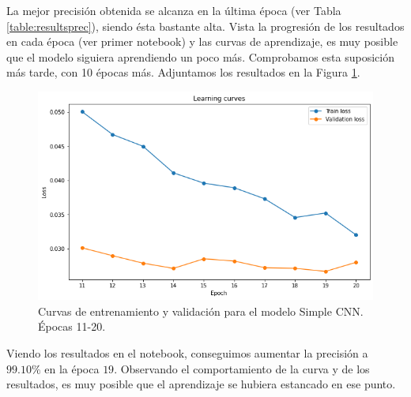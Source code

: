 \documentclass[12pt]{scrartcl}
\begin{document}
\begin{itemize}
    La mejor precisión obtenida se alcanza en la última época (ver Tabla \ref{table:resultsprec}), siendo ésta bastante alta. Vista la progresión de los resultados en cada época (ver primer notebook) y las curvas de aprendizaje,
    es muy posible que el modelo siguiera aprendiendo un poco más. Comprobamos esta suposición más tarde, con 10 épocas más. Adjuntamos los resultados
    en la Figura \ref{fig:curvas12}.
    \begin{figure}[H]
        \centering
        \includegraphics[scale=0.48]{curvas12.png}
        \caption{Curvas de entrenamiento y validación para el modelo Simple CNN. Épocas 11-20.}
        \label{fig:curvas12}
    \end{figure}
    Viendo los resultados en el notebook, conseguimos aumentar la precisión a $99.10\%$ en la época $19$. Observando el comportamiento de la curva y de los resultados, es muy posible que el aprendizaje se hubiera estancado en ese punto.


\end{itemize}
\end{document}
